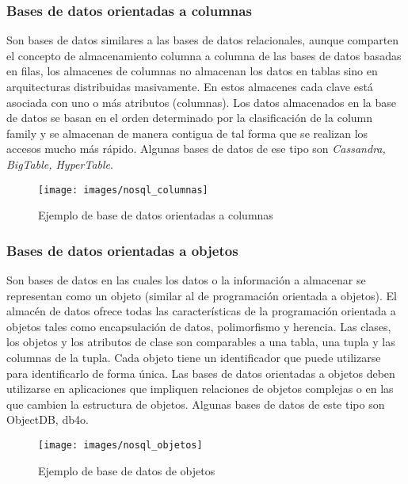 \subsubsection{Bases de datos orientadas a columnas}

Son bases de datos similares a las bases de datos relacionales, aunque comparten el concepto de almacenamiento columna a columna de las bases de datos basadas en filas, los almacenes de columnas no almacenan los datos en tablas sino en arquitecturas distribuidas masivamente. En estos  almacenes  cada  clave  está  asociada  con  uno  o  más  atributos  (columnas).    Los  datos almacenados en la base de datos se basan en el orden determinado por la clasificación de la column family y se almacenan de manera contigua de tal forma que se realizan los accesos mucho más rápido. Algunas bases de datos de ese tipo son \textit{Cassandra, BigTable, HyperTable}.

\begin{figure}[!h]
	\centering
	\texttt{[image: images/nosql\_columnas]}
	\caption{Ejemplo de base de datos orientadas a columnas}
	\label{fig:nosql_columnas}
\end{figure}

\subsubsection{Bases de datos orientadas a objetos}

Son bases de datos en las cuales los datos o la información a almacenar se representan como un objeto (similar al de programación orientada a objetos). El almacén de datos ofrece todas las características  de  la  programación  orientada  a  objetos  tales  como  encapsulación  de  datos, polimorfismo y herencia. Las clases, los objetos y los atributos de clase son comparables a una tabla, una tupla y las columnas de la tupla. Cada objeto tiene un identificador que puede utilizarse para identificarlo de forma única. Las bases de datos orientadas a objetos deben utilizarse en aplicaciones que impliquen relaciones de objetos complejas o en las que cambien la estructura de objetos. Algunas bases de datos de este tipo son ObjectDB, db4o.

\begin{figure}[!h]
	\centering
	\texttt{[image: images/nosql\_objetos]}
	\caption{Ejemplo de base de datos de objetos}
	\label{fig:nosql_objetos}
\end{figure}

\newpage

